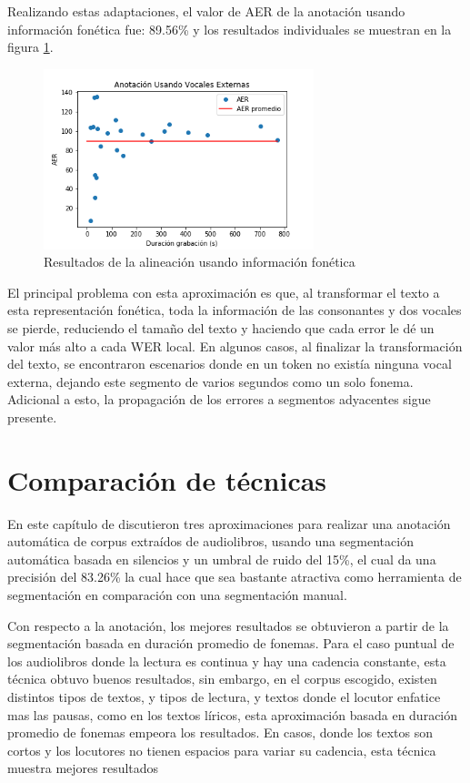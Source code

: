 Realizando estas adaptaciones, el valor de AER de la anotación usando información fonética fue: 89.56\% y los resultados individuales se muestran en la figura \ref{img:aer_vocales_externas}.

\begin{figure}[H]
\caption{Resultados de la alineación usando información fonética}
\label{img:aer_vocales_externas}
\begin{center}
\includegraphics[width=0.7\textwidth]{imagenes/04_04_aer_vocales_externas.png}
\end{center}
\end{figure}

El principal problema con esta aproximación es que, al transformar el texto a esta representación fonética, toda la información de las consonantes y dos vocales se pierde, reduciendo el tamaño del texto y haciendo que cada error le dé un valor más alto a cada WER local. En algunos casos, al finalizar la transformación del texto, se encontraron escenarios donde en un token no existía ninguna vocal externa, dejando este segmento de varios segundos como un solo fonema. Adicional a esto, la propagación de los errores a segmentos adyacentes sigue presente.

\section{Comparación de técnicas}

En este capítulo de discutieron tres aproximaciones para realizar una anotación automática de corpus extraídos de audiolibros, usando una segmentación automática basada en silencios y un umbral de ruido del 15\%, el cual da una precisión del 83.26\% la cual hace que sea bastante atractiva como herramienta de segmentación en comparación con una segmentación manual.

Con respecto a la anotación, los mejores resultados se obtuvieron a partir de la segmentación basada en duración promedio de fonemas. Para el caso puntual de los audiolibros donde la lectura es continua y hay una cadencia constante, esta técnica obtuvo buenos resultados, sin embargo, en el corpus escogido, existen distintos tipos de textos, y tipos de lectura, y textos donde el locutor enfatice mas las pausas, como en los textos líricos, esta aproximación basada en duración promedio de fonemas empeora los resultados. En casos, donde los textos son cortos y los locutores no tienen espacios para variar su cadencia, esta técnica muestra mejores resultados

